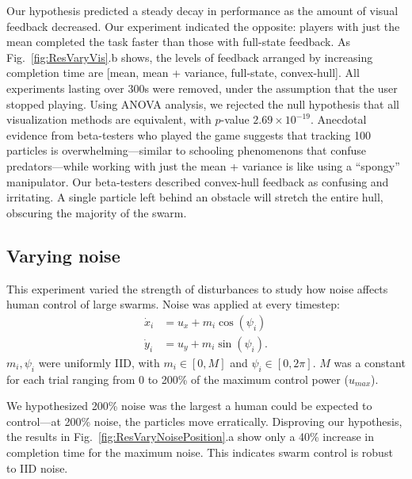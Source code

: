 Our hypothesis predicted a steady decay in performance as the amount of visual feedback decreased.
Our experiment indicated the opposite: players with just the mean completed the task faster than those with full-state feedback.  As Fig.~\ref{fig:ResVaryVis}.b shows, the levels of feedback arranged by increasing completion time are [mean, mean + variance, full-state, convex-hull].  All experiments lasting over 300s were removed, under the assumption that the user stopped playing. 
Using ANOVA analysis, we rejected the null hypothesis that all visualization methods are equivalent, with $p$-value $2.69\times10^{-19}$.
Anecdotal evidence from beta-testers who played the game suggests that tracking 100 particles is overwhelming---similar to schooling phenomenons that confuse predators---while working with just the mean + variance is like using a ``spongy'' manipulator. Our beta-testers described convex-hull feedback as confusing and irritating.  A single particle left behind an obstacle will stretch the entire hull, obscuring the majority of the swarm.

\subsection{Varying noise}
This experiment varied the strength of %
disturbances to study how noise affects human control of large swarms. Noise was applied at every timestep:
\begin{align*}
\dot{x}_i &= u_x + m_i\cos(\psi_i)\\
 \dot{y}_i &= u_y + m_i\sin(\psi_i).
 \end{align*}
$m_i,\psi_i$ were uniformly IID, with $m_i\in[0,M]$ and $\psi_i\in[0,2\pi]$. $M$ was a constant for each trial ranging from 0 to 200\% of the maximum control power ($u_{max}$).
 
We hypothesized 200\% noise was the largest a human could be expected to control---at 200\% noise, the particles move erratically.  Disproving our hypothesis, the results in Fig.~\ref{fig:ResVaryNoisePosition}.a show only a 40\% increase in completion time for the maximum noise. This indicates swarm control is robust to IID noise.

